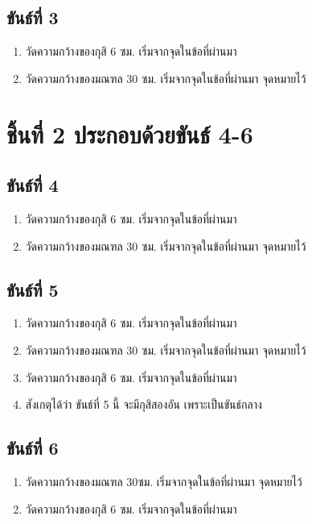\subsection{ขันธ์ที่ 3}

\begin{enumerate}
\def\labelenumi{(\arabic{enumi})}
\item
  วัดความกว้างของกุสิ 6 ซม. เริ่มจากจุดในข้อที่ผ่านมา
\item
  วัดความกว้างของมณฑล 30 ซม. เริ่มจากจุดในข้อที่ผ่านมา จุดหมายไว้
\end{enumerate}

\section{ชิ้นที่ 2 ประกอบด้วยขันธ์ 4-6}

\subsection{ขันธ์ที่ 4}

\begin{enumerate}
\def\labelenumi{(\arabic{enumi})}
\item
  วัดความกว้างของกุสิ 6 ซม. เริ่มจากจุดในข้อที่ผ่านมา
\item
  วัดความกว้างของมณฑล 30 ซม. เริ่มจากจุดในข้อที่ผ่านมา จุดหมายไว้
\end{enumerate}

\subsection{ขันธ์ที่ 5}

\begin{enumerate}
\def\labelenumi{(\arabic{enumi})}
\item
  วัดความกว้างของกุสิ 6 ซม. เริ่มจากจุดในข้อที่ผ่านมา
\item
  วัดความกว้างของมณฑล 30 ซม. เริ่มจากจุดในข้อที่ผ่านมา จุดหมายไว้
\item
  วัดความกว้างของกุสิ 6 ซม. เริ่มจากจุดในข้อที่ผ่านมา
\item
  สังเกตุได้ว่า ขันธ์ที่ 5 นี้ จะมีกุสิสองอัน เพราะเป็นขันธ์กลาง
\end{enumerate}

\subsection{ขันธ์ที่ 6}

\begin{enumerate}
\def\labelenumi{(\arabic{enumi})}
\item
  วัดความกว้างของมณฑล 30ซม. เริ่มจากจุดในข้อที่ผ่านมา จุดหมายไว้
\item
  วัดความกว้างของกุสิ 6 ซม. เริ่มจากจุดในข้อที่ผ่านมา
\end{enumerate}

